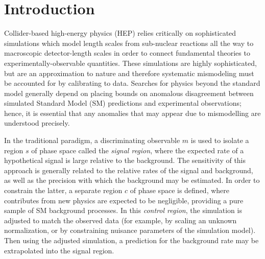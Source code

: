 \documentclass[reprint,nofootinbib,...]{revtex4-1}
\begin{document}


\section{Introduction}
\label{sec:intro}
Collider-based high-energy physics (HEP) relies critically on sophisticated simulations which model length scales from sub-nuclear reactions all the way to macroscopic detector-length scales in order to connect fundamental theories to experimentally-observable quantities.
These simulations are highly sophisticated, but are an approximation to nature and therefore systematic mismodeling must be accounted for by calibrating to data.
Searches for physics beyond the standard model generally depend on placing bounds on anomalous disagreement between simulated Standard Model (SM) predictions and experimental observations; hence, it is essential that any anomalies that may appear due to mismodelling are understood precisely.

In the traditional paradigm, a discriminating observable $m$ is used to isolate a region $s$ of phase space called the \textit{signal region}, where the expected rate of a hypothetical signal is large relative to the background.
The sensitivity of this approach is generally related to the relative rates of the signal and background, as well as the precision with which the background may be estimated.
In order to constrain the latter, a separate region $c$ of phase space is defined, where contributes from new physics are expected to be negligible, providing a pure sample of SM background processes.
In this \textit{control region}, the simulation is adjusted to match the observed data (for example, by scaling an unknown normalization, or by constraining nuisance parameters of the simulation model).
Then using the adjusted simulation, a prediction for the background rate may be extrapolated into the signal region.

\end{document}
